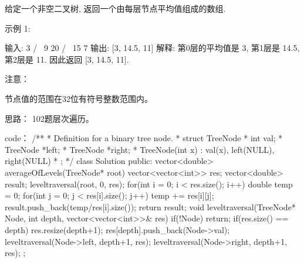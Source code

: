 给定一个非空二叉树, 返回一个由每层节点平均值组成的数组.

示例 1:

输入:
    3
   / \
  9  20
    /  \
   15   7
输出: [3, 14.5, 11]
解释:
第0层的平均值是 3,  第1层是 14.5, 第2层是 11. 因此返回 [3, 14.5, 11].

注意：

    节点值的范围在32位有符号整数范围内。


























思路：
102题层次遍历。
























code：
/**
 * Definition for a binary tree node.
 * struct TreeNode {
 *     int val;
 *     TreeNode *left;
 *     TreeNode *right;
 *     TreeNode(int x) : val(x), left(NULL), right(NULL) {}
 * };
 */
class Solution {
public:
    vector<double> averageOfLevels(TreeNode* root) {
        vector<vector<int>> res;
        vector<double> result;
        leveltraversal(root, 0, res);
        for(int i = 0; i < res.size(); i++)
        {
            double temp = 0;
            for(int j = 0; j < res[i].size(); j++)
            {
                temp += res[i][j];
            }
            result.push_back(temp/res[i].size());
        }
        return result;
    }
    void leveltraversal(TreeNode* Node, int depth, vector<vector<int>>& res)
    {
        if(!Node) return;
        if(res.size() == depth)
            res.resize(depth+1);
        res[depth].push_back(Node->val);
        leveltraversal(Node->left, depth+1, res);
        leveltraversal(Node->right, depth+1, res);
    }
};